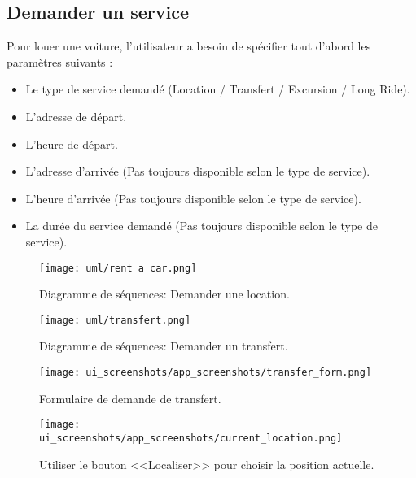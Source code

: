 \subsection{Demander un service}
Pour louer une voiture, l'utilisateur a besoin de spécifier tout d'abord les paramètres suivants :
\begin{itemize}
    \item Le type de service demandé (Location / Transfert / Excursion / Long Ride).
    \item L'adresse de départ.
    \item L'heure de départ.
    \item L'adresse d'arrivée (Pas toujours disponible selon le type de service).
    \item L'heure d'arrivée (Pas toujours disponible selon le type de service).
    \item La durée du service demandé (Pas toujours disponible selon le type de service).
\end{itemize}
\vspace{1cm}
\begin{figure}[H]
    \centering
    \texttt{[image: uml/rent a car.png]}
    \vspace{1cm}
    \caption{Diagramme de séquences: Demander une location.}
    \label{fig:seq_location}
\end{figure}
\vspace{1cm}
\begin{figure}[H]
    \centering
    \texttt{[image: uml/transfert.png]}
    \vspace{1cm}
    \caption{Diagramme de séquences: Demander un transfert.}
    \label{fig:seq_transfert}
\end{figure}
\vspace{1cm}
\newpage
\begin{multicols}{2}
    \begin{figure}[H]
        \centering
        \texttt{[image: ui\_screenshots/app\_screenshots/transfer\_form.png]}
        \captionsetup{justification=centering}
        \caption{Formulaire de demande de transfert.}
        \label{fig:app_transfer}
    \end{figure}
    \begin{figure}[H]
        \centering
        \texttt{[image: ui\_screenshots/app\_screenshots/current\_location.png]}
        \captionsetup{justification=centering}
        \caption{Utiliser le bouton <<Localiser>> pour choisir la position actuelle.}
        \label{fig:app_transfer_current_pos}
    \end{figure}
\end{multicols}
